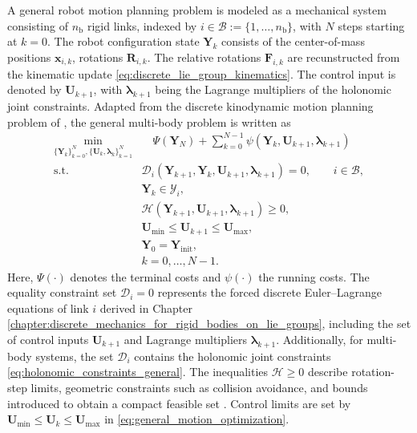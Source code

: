 A general robot motion planning problem is modeled as a mechanical system 
consisting of \(n_{\mathrm b}\) rigid links, 
indexed by \(i\in\mathcal B:=\{1,\ldots,n_{\mathrm b}\}\), with $N$ steps starting at $k=0$. 
The robot configuration state \(\bm{Y}_k\) consists of the center-of-mass positions \(\bm{x}_{i,k}\), 
rotations \(\bm{R}_{i,k}\). The relative rotations \(\bm{F}_{i,k}\) are recunstructed from the 
kinematic update \eqref{eq:discrete_lie_group_kinematics}. The control input is denoted 
by \(\bm{U}_{k+1}\), with \(\bm{\lambda}_{k+1}\) being the Lagrange multipliers of the holonomic joint 
constraints. Adapted from the discrete kinodynamic motion planning problem of 
\cite{Sangli2025}, the general multi-body problem is written as
\begin{subequations}
\label{eq:general_motion_optimization}
\begin{align}
\min_{\{\bm{Y}_k\}_{k=0}^{N},\{\bm{U}_k,\bm{\lambda}_k\}_{k=1}^{N}}
&\quad \Psi(\bm{Y}_N)+\sum_{k=0}^{N-1}\psi(\bm{Y}_k,\bm{U}_{k+1},\bm{\lambda}_{k+1})\\
\text{s.t.}\quad
&\mathcal D_i(\bm{Y}_{k+1},\bm{Y}_k,\bm{U}_{k+1},\bm{\lambda}_{k+1})=0, \qquad i\in\mathcal B,\\
&\bm{Y}_k\in\mathcal Y_i, \\
&\mathcal{H}(\bm{Y}_{k+1},\bm{U}_{k+1},\bm{\lambda}_{k+1})\geq0,\\
&\bm{U}_{\min}\leq \bm{U}_{k+1}\leq \bm{U}_{\max},\\
&\bm{Y}_0=\bm{Y}_{\mathrm{init}},\\
&k=0,\ldots,N-1. \nonumber
\end{align}
\end{subequations}
Here, \(\Psi(\cdot)\) denotes the terminal costs and \(\psi(\cdot)\) the running costs. 
The equality constraint set \(\mathcal D_i=0\) represents the forced 
discrete Euler--Lagrange equations of link \(i\) derived in Chapter \ref{chapter:discrete_mechanics_for_rigid_bodies_on_lie_groups}, 
including the set of control inputs $\bm{U}_{k+1}$ and Lagrange multipliers $\bm{\lambda}_{k+1}$. Additionally,
for multi-body systems, the set
\(\mathcal D_i\) contains the holonomic joint constraints \eqref{eq:holonomic_constraints_general}.
The inequalities \(\mathcal{H}\geq0\) describe rotation-step limits, 
geometric constraints such as collision avoidance, and bounds introduced to obtain a compact feasible set \cite{Kang_2026Fast}. 
Control limits are set by \(\bm{U}_{\min}\leq \bm{U}_k\leq \bm{U}_{\max}\) in \eqref{eq:general_motion_optimization}.

